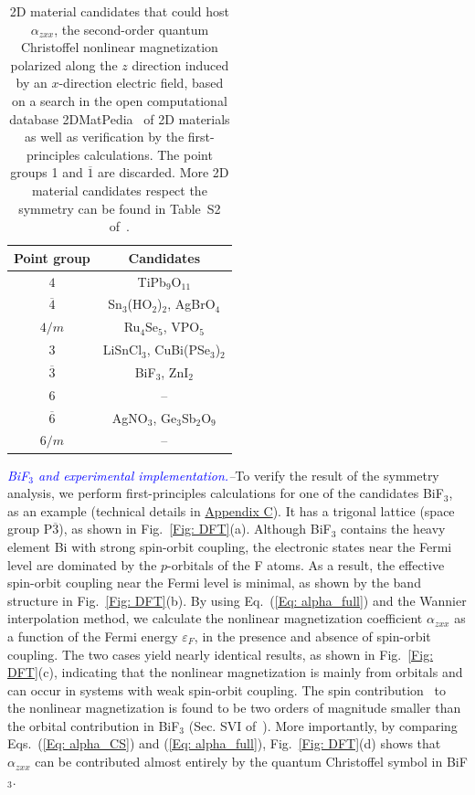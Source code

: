 \documentclass[aps,prl,twocolumn,amsmath,amssymb,showpacs, superscriptaddress,notitlepage,longbibliography,10pt]{revtex4-1}
\begin{document}
\begin{table}[htbp]
\caption{2D material candidates that could host $\alpha_{zxx}$, the second-order quantum Christoffel nonlinear magnetization polarized along the $z$ direction induced by an $x$-direction electric field, based on a search in the open computational database 2DMatPedia~\cite{2DMat} of 2D materials as well as verification by the first-principles calculations. The point groups 1 and $\overline 1$ are discarded. More 2D material candidates respect the symmetry can be found in Table~S2 of~\cite{Supp}.}
\label{Tab: candidates}
\centering\setlength{\tabcolsep}{3.7pt}
\renewcommand{\arraystretch}{1.5}
\begin{tabular}{cc}
\hline\hline
Point group & Candidates\\
\hline
$4$ & TiPb$_9$O$_{11}$ \\
$\overline 4$ &  Sn$_3$(HO$_2$)$_2$, AgBrO$_4$ \\
$4/m$ &  Ru$_4$Se$_5$, VPO$_5$\\
$3$ &   LiSnCl$_3$, CuBi(PSe$_3$)$_2$ \\
$\overline 3$ & BiF$_3$, ZnI$_2$\\
$6$ &  -- \\
$\overline 6$ & AgNO$_3$, Ge$_3$Sb$_2$O$_9$ \\
$6/m$ & -- \\
\hline\hline
\end{tabular}
\end{table}


\textit{\textcolor{blue}{BiF$_3$ and experimental implementation.}--}To verify the result of the symmetry analysis, we perform first-principles calculations for one of the candidates BiF$_3$, as an example (technical details in \hyperlink{Appendix C}{Appendix C}). It has a trigonal lattice (space group P$\overline{3}$), as shown in Fig.~\ref{Fig: DFT}(a). Although BiF$_3$ contains the heavy element Bi with strong spin-orbit coupling, the electronic states near the Fermi level are dominated by the $p$-orbitals of the F atoms. As a result, the effective spin-orbit coupling near the Fermi level is minimal, as shown by the band structure in Fig.~\ref{Fig: DFT}(b). By using Eq.~(\ref{Eq: alpha_full}) and the Wannier interpolation method, we calculate the nonlinear magnetization coefficient $\alpha_{zxx}$ as a function of the Fermi energy $\varepsilon_F$, in the presence and absence of spin-orbit coupling. The two cases yield nearly identical results, as shown in Fig.~\ref{Fig: DFT}(c), indicating that the nonlinear magnetization is mainly from orbitals and can occur in systems with weak spin-orbit coupling. The spin contribution~\cite{YangSY23prl} to the nonlinear magnetization is found to be two orders of magnitude smaller than the orbital contribution in BiF$_3$ (Sec. SVI of~\cite{Supp}). More importantly, by comparing Eqs.~(\ref{Eq: alpha_CS}) and (\ref{Eq: alpha_full}),  Fig.~\ref{Fig: DFT}(d) shows that $\alpha_{zxx}$ can be contributed almost entirely by the quantum Christoffel symbol in BiF$_3$.
\end{document}
